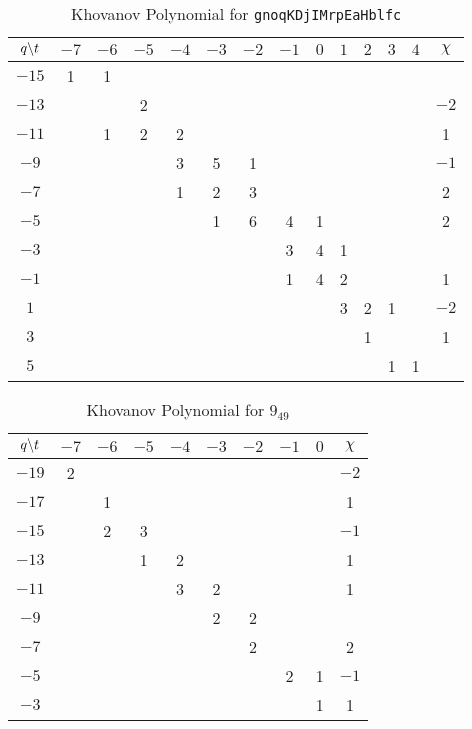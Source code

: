 \begin{table}
    \centering
    \begin{tabular}{| c | c |c | c | c | c | c | c | c | c | c | c | c | c |}
        \hline
        $q\symbol{92}t$&$-7$&$-6$&$-5$&$-4$&$-3$&$-2$&$-1$&$0$&$1$&$2$&$3$&$4$&$\chi$\\
        \hline
        $-15$&1&1&&&&&&&&&&&\\
        \hline
        $-13$&&&2&&&&&&&&&&$-2$\\
        \hline
        $-11$&&1&2&2&&&&&&&&&1\\
        \hline
        $-9$&&&&3&5&1&&&&&&&$-1$\\
        \hline
        $-7$&&&&1&2&3&&&&&&&2\\
        \hline
        $-5$&&&&&1&6&4&1&&&&&2\\
        \hline
        $-3$&&&&&&&3&4&1&&&&\\
        \hline
        $-1$&&&&&&&1&4&2&&&&1\\
        \hline
        $1$&&&&&&&&&3&2&1&&$-2$\\
        \hline
        $3$&&&&&&&&&&1&&&1\\
        \hline
        $5$&&&&&&&&&&&1&1&\\
        \hline
    \end{tabular}
    \caption{Khovanov Polynomial for \texttt{gnoqKDjIMrpEaHblfc}}
\end{table}
\begin{table}
    \centering
    \begin{tabular}{| c | c | c | c | c | c | c | c | c | c |}
        \hline
        $q\symbol{92}t$&$-7$&$-6$&$-5$&$-4$&$-3$&$-2$&$-1$&$0$&$\chi$\\
        \hline
        $-19$&2&&&&&&&&$-2$\\
        \hline
        $-17$&&1&&&&&&&1\\
        \hline
        $-15$&&2&3&&&&&&$-1$\\
        \hline
        $-13$&&&1&2&&&&&1\\
        \hline
        $-11$&&&&3&2&&&&1\\
        \hline
        $-9$&&&&&2&2&&&\\
        \hline
        $-7$&&&&&&2&&&2\\
        \hline
        $-5$&&&&&&&2&1&$-1$\\
        \hline
        $-3$&&&&&&&&1&1\\
        \hline
    \end{tabular}
    \caption{Khovanov Polynomial for $9_{49}$}
\end{table}
